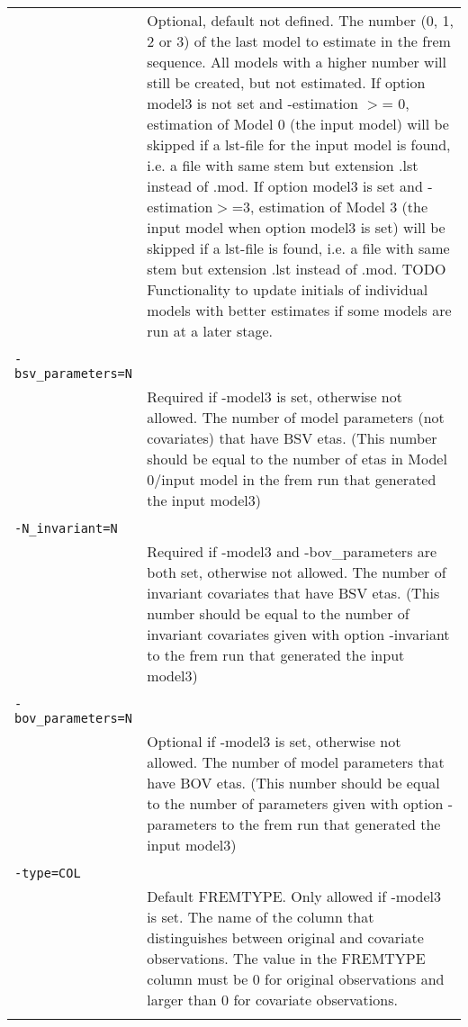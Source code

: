 \documentclass[a4paper,12pt]{article}
\begin{document}
\begin{longtable}{p{1in}p{4in}}
\nopagebreak
 & Optional, default not defined. The number (0, 1, 2 or 3) of the last model to estimate in the frem sequence. All models with a higher number will still be created, but not estimated. If option model3 is not set and -estimation $>$= 0, estimation of Model 0 (the input model) will be skipped if a lst-file for the input model is found, i.e. a file with same stem but extension .lst instead of .mod. If option model3 is set and -estimation$>$=3, estimation of Model 3 (the input model when option model3 is set) will be skipped if a lst-file is found, i.e. a file with same stem but extension .lst instead of .mod. TODO Functionality to update initials of individual models with better estimates if some models are run at a later stage. \\
\\
\verb|-bsv_parameters=N| & \\
\nopagebreak
 & Required if -model3 is set, otherwise not allowed. The number of model parameters (not covariates) that have BSV etas. (This number should be equal to the number of etas in Model 0/input model in the frem run that generated the input model3) \\
\\
\verb|-N_invariant=N| & \\
\nopagebreak
 & Required if -model3 and -bov\_parameters are both set, otherwise not allowed. The number of invariant covariates that have BSV etas. (This number should be equal to the number of invariant covariates given with option -invariant to the frem run that generated the input model3) \\
\\
\verb|-bov_parameters=N| & \\
\nopagebreak
 & Optional if -model3 is set, otherwise not allowed. The number of model parameters that have BOV etas. (This number should be equal to the number of parameters given with option -parameters to the frem run that generated the input model3)  \\
\\
\verb|-type=COL| & \\
\nopagebreak
 & Default FREMTYPE. Only allowed if -model3 is set. The name of the column that distinguishes between original and covariate observations. The value in the FREMTYPE column must be 0 for original observations and larger than 0 for covariate observations.  \\
\\
\end{longtable}
\end{document}

